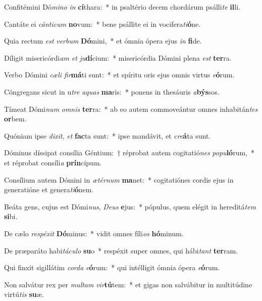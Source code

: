 \item Confitémini Dó\textit{mi}\textit{no} \textit{in} \textbf{cí}thara:~* in psaltério decem chordárum psálli\textit{te} \textbf{il}li.
\item Cantáte ei \textit{cán}\textit{ti}\textit{cum} \textbf{no}vum:~* bene psállite ei in vocifera\textit{ti}\textbf{ó}ne.
\item Quia rectum \textit{est} \textit{ver}\textit{bum} \textbf{Dó}mini,~* et ómnia ópera ejus \textit{in} \textbf{fi}de.
\item Díligit misericórdi\textit{am} \textit{et} \textit{ju}\textbf{dí}cium:~* misericórdia Dómini plena \textit{est} \textbf{ter}ra.
\item Verbo Dómini \textit{cæ}\textit{li} \textit{fir}\textbf{má}ti sunt:~* et spíritu oris ejus omnis virtus \textit{e}\textbf{ó}rum.
\item Cóngregans sicut in u\textit{tre} \textit{a}\textit{quas} \textbf{ma}ris:~* ponens in thesáuris \textit{a}\textbf{býs}sos.
\item Tímeat Dómi\textit{num} \textit{om}\textit{nis} \textbf{ter}ra:~* ab eo autem commoveántur omnes inhabitán\textit{tes} \textbf{or}bem.
\item Quóniam ipse \textit{di}\textit{xit}, \textit{et} \textbf{fac}ta sunt:~* ipse mandávit, et \textit{cre}\textbf{á}ta sunt.
\item Dóminus díssipat consília Géntium:~† réprobat autem cogitatió\textit{nes} \textit{po}\textit{pu}\textbf{ló}rum,~* et réprobat consíli\textit{a} \textbf{prín}cipum.
\item Consílium autem Dómini in \textit{æ}\textit{tér}\textit{num} \textbf{ma}net:~* cogitatiónes cordis ejus in generatióne et genera\textit{ti}\textbf{ó}nem.
\item Beáta gens, cujus est Dómi\textit{nus}, \textit{De}\textit{us} \textbf{e}jus:~* pópulus, quem elégit in hereditá\textit{tem} \textbf{si}bi.
\item De cælo \textit{re}\textit{spé}\textit{xit} \textbf{Dó}minus:~* vidit omnes fíli\textit{os} \textbf{hó}minum.
\item De præparáto habi\textit{tá}\textit{cu}\textit{lo} \textbf{su}o~* respéxit super omnes, qui hábi\textit{tant} \textbf{ter}ram.
\item Qui finxit sigillátim \textit{cor}\textit{da} \textit{e}\textbf{ó}rum:~* qui intélligit ómnia ópera \textit{e}\textbf{ó}rum.
\item Non salvátur rex per \textit{mul}\textit{tam} \textit{vir}\textbf{tú}tem:~* et gigas non salvábitur in multitúdine virtú\textit{tis} \textbf{su}æ.
